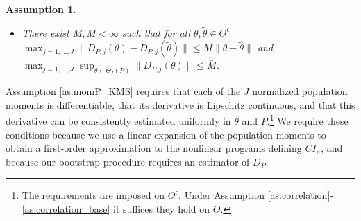 \documentclass[letterpaper,11pt]{article}
\theoremstyle{myplain}
\theoremstyle{mydefinition}
\newtheorem{assumption}{Assumption}[section]
\theoremstyle{myremark}
\numberwithin{equation}{section}
\numberwithin{figure}{section}
\begin{document}
\begin{appendices}
\begin{assumption}
\begin{itemize}
\item[(ii)] There exist $M, \bar{M}<\infty$ such that for all $\theta,\tilde{\theta} \in \Theta^\epsilon$ $\max_{j=1,\dots,J} \|D_{P,j}(\theta)-D_{P,j}(\tilde{\theta})\|\le M \|\theta-\tilde{\theta}\|$ and $\max_{j=1,\dots,J} \sup_{\theta \in \Theta_I(P)}\|D_{P,j}(\theta)\|\le  \bar{M}$. 
\end{itemize}
\end{assumption}
Assumption \ref{as:momP_KMS} requires that each of the $J$ normalized population moments is differentiable, that its derivative is Lipschitz continuous, and that this derivative can be consistently estimated uniformly in $\theta$ and $P$.\footnote{The requirements are imposed on $\Theta^\epsilon$. Under Assumption \ref{as:correlation}-\ref{as:correlation_base} it suffices they hold on $\Theta$.} We require these conditions because we use a linear expansion of the population moments to obtain a first-order approximation to the nonlinear programs defining $CI_n$, and because our bootstrap procedure requires an estimator of $D_{P}$. 


\end{appendices}
\end{document}
